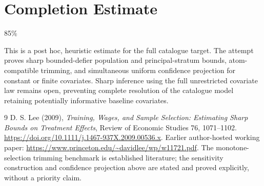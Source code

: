 \documentclass[11pt,a4paper]{article}
\begin{document}
\section{Completion Estimate}
85\%

This is a post hoc, heuristic estimate for the full catalogue target.
The attempt proves sharp bounded-defier population and principal-stratum bounds, atom-compatible trimming, and simultaneous uniform confidence projection for constant or finite covariates. Sharp inference using the full unrestricted covariate law remains open, preventing complete resolution of the catalogue model retaining potentially informative baseline covariates.

\begin{thebibliography}{9}
 D. S. Lee (2009), \emph{Training, Wages, and Sample Selection: Estimating Sharp Bounds on Treatment Effects}, Review of Economic Studies 76, 1071--1102. \url{https://doi.org/10.1111/j.1467-937X.2009.00536.x}. Earlier author-hosted working paper: \url{https://www.princeton.edu/~davidlee/wp/w11721.pdf}. The monotone-selection trimming benchmark is established literature; the sensitivity construction and confidence projection above are stated and proved explicitly, without a priority claim.
\end{thebibliography}
\end{document}

